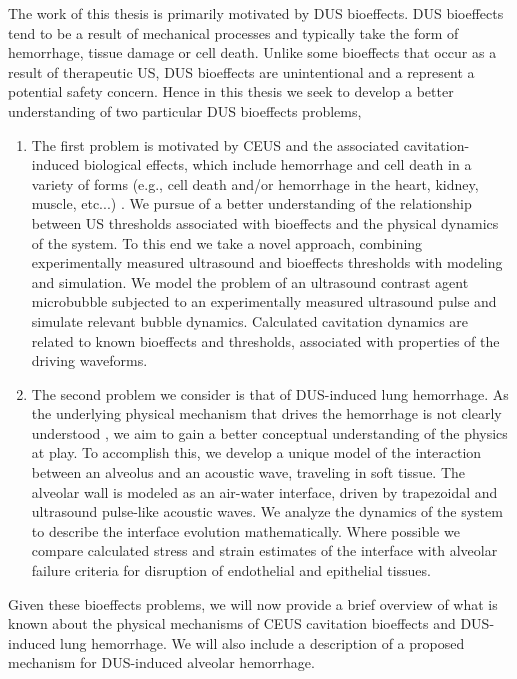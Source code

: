 The work of this thesis is primarily motivated by \ac{DUS} bioeffects.
\ac{DUS} bioeffects tend to be a result of mechanical processes and
typically take the form of hemorrhage, tissue damage or cell
death. Unlike some bioeffects that occur as a result of therapeutic
\ac{US}, \ac{DUS} bioeffects are unintentional and a represent a
potential safety concern. Hence in this thesis we seek to develop a
better understanding of two particular \ac{DUS} bioeffects problems,
\begin{enumerate}
\item The first problem is motivated by \ac{CEUS} and the associated
  cavitation-induced biological effects, which include hemorrhage and
  cell death in a variety of forms (e.g., cell death and/or
  hemorrhage in the heart, kidney, muscle, etc...)
  \citep{Miller2008a}. We pursue of a better understanding of the
  relationship between \ac{US} thresholds associated with bioeffects
  and the physical dynamics of the system. To this end we take a novel
  approach, combining experimentally measured ultrasound and
  bioeffects thresholds with modeling and simulation. We model the
  problem of an ultrasound contrast agent microbubble subjected to an
  experimentally measured ultrasound pulse and simulate relevant
  bubble dynamics. Calculated cavitation dynamics are related to known
  bioeffects and thresholds, associated with properties of the driving
  waveforms.
\item The second problem we consider is that of \ac{DUS}-induced lung
  hemorrhage. As the underlying physical mechanism that drives the
  hemorrhage is not clearly understood \citep{OBrien2007}, we aim to
  gain a better conceptual understanding of the physics at play. To
  accomplish this, we develop a unique model of the interaction
  between an alveolus and an acoustic wave, traveling in soft
  tissue. The alveolar wall is modeled as an air-water interface,
  driven by trapezoidal and ultrasound pulse-like acoustic waves. We
  analyze the dynamics of the system to describe the interface
  evolution mathematically. Where possible we compare calculated
  stress and strain estimates of the interface with alveolar failure
  criteria for disruption of endothelial and epithelial tissues.
\end{enumerate}

Given these bioeffects problems, we will now provide a brief overview
of what is known about the physical mechanisms of \ac{CEUS} cavitation
bioeffects and \ac{DUS}-induced lung hemorrhage. We will also include
a description of a proposed mechanism for \ac{DUS}-induced alveolar
hemorrhage.

